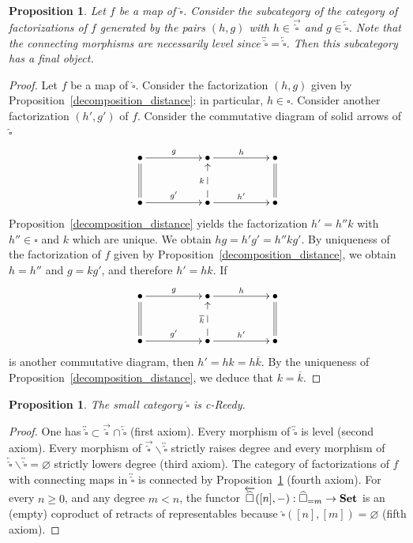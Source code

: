 \documentclass[a4paper,12pt]{amsart}
\makeatletter
\renewcommand{\vec}{\overrightarrow}
\newtheorem{prop}[thm]{Proposition}
\newcommand{\bp}{\begin{prop}}
\newcommand{\ep}{\end{prop}}
\newcommand{\bpf}{\begin{proof}}
\newcommand{\epf}{\end{proof}}
\theoremstyle{definition}
\newcommand{\fr}[1]{\ar@{->}[r]^-{#1}}
\renewcommand{\geq}{\geqslant}
\newcommand{\brm}[1]{{\rm{\mathbf{#1}}}}
\newcommand{\set}{{\brm{Set}}}
\makeatother
\begin{document}
\bp \label{final}
Let $f$ be a map of $\widehat{\square}$. Consider the subcategory of the category of factorizations of $f$ generated by the pairs $(h,g)$ with $h\in\overrightarrow{\widehat{\square}}$ and $g\in \overleftarrow{\widehat{\square}}$. Note that the connecting morphisms are necessarily level since $\overleftrightarrow{\widehat{\square}}=\overleftarrow{\widehat{\square}}$. Then this subcategory has a final object.
\ep

\bpf
Let $f$ be a map of $\widehat{\square}$. Consider the factorization $(h,g)$ given by Proposition~\ref{decomposition_distance}: in particular, $h\in \square$. Consider another factorization $(h',g')$ of $f$. Consider the commutative diagram of solid arrows of $\widehat{\square}$
\[
\xymatrix@C=5em@R=3em
{
	\bullet \fr{g} \ar@{=}[d] & \bullet \fr{h}& \bullet \ar@{=}[d] \\
	\bullet \fr{g'} & \ar@{-->}[u]^-{k}\bullet \fr{h'} & \bullet 
}
\]
Proposition~\ref{decomposition_distance} yields the factorization $h'=h''k$ with $h''\in \square$ and $k$ which are unique. We obtain $hg=h'g'=h''kg'$. By uniqueness of the factorization of $f$ given by Proposition~\ref{decomposition_distance}, we obtain $h=h''$ and $g=kg'$, and therefore $h'=hk$. If  
\[
\xymatrix@C=5em@R=3em
{
	\bullet \fr{g} \ar@{=}[d] & \bullet \fr{h}& \bullet \ar@{=}[d] \\
	\bullet \fr{g'} & \ar@{-->}[u]^-{\overline{k}}\bullet \fr{h'} & \bullet 
}
\] 
is another commutative diagram, then $h'=hk=h\overline{k}$. By the uniqueness of Proposition~\ref{decomposition_distance}, we deduce that $k=\overline{k}$. 
\epf


\bp \label{example-c-Reedy}
The small category $\widehat{\square}$ is c-Reedy.
\ep

\bpf
One has $\overleftrightarrow{\widehat{\square}}\subset \vec{\widehat{\square}} \cap \overleftarrow{\widehat{\square}}$ (first axiom). Every morphism of $\overleftrightarrow{\widehat{\square}}$ is level (second axiom). Every morphism of $\vec{\widehat{\square}}\backslash \overleftrightarrow{\widehat{\square}}$ strictly raises degree and every morphism of $\overleftarrow{\widehat{\square}}\backslash \overleftrightarrow{\widehat{\square}}=\varnothing$ strictly lowers degree (third axiom). The category of factorizations of $f$ with connecting maps in $\overleftrightarrow{\widehat{\square}}$ is connected by Proposition~\ref{final} (fourth axiom). For every $n\geq 0$, and any degree $m<n$, the functor $\overleftarrow{\widehat{\square}}([n],-):\widehat{\square}_{=m}\to \set$ is an (empty) coproduct of retracts of representables because $\widehat{\square}([n],[m])=\varnothing$ (fifth axiom). 
\epf
\end{document}
